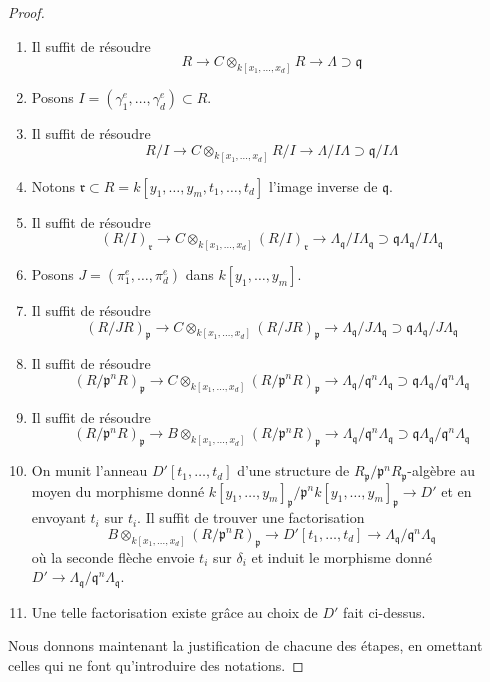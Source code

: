 \begin{proof}
\begin{enumerate}
$$R = k[y_1, \ldots, y_m, t_1, \ldots, t_d]
$$
en envoyant $x_i$ sur $\gamma_i = \pi_i t_i$.
\item
\label{item-first-solve}
Il suffit de résoudre
$$
R
\to
C \otimes_{k[x_1, \ldots, x_d]} R
\to
\Lambda \supset \mathfrak q
$$
\item
\label{item-set-I}
Posons $I = (\gamma_1^e, \ldots, \gamma_d^e) \subset R$.
\item
\label{item-second-resolve}
Il suffit de résoudre
$$
R/I
\to
C \otimes_{k[x_1, \ldots, x_d]} R/I
\to
\Lambda/I\Lambda \supset \mathfrak q/I\Lambda
$$
\item
\label{item-set-r}
Notons $\mathfrak r \subset R = k[y_1, \ldots, y_m, t_1, \ldots, t_d]$
l'image inverse de $\mathfrak q$.
\item
\label{item-third-resolve}
Il suffit de résoudre
$$
(R/I)_\mathfrak r \to
C \otimes_{k[x_1, \ldots, x_d]} (R/I)_\mathfrak r \to
\Lambda_\mathfrak q/I\Lambda_\mathfrak q
\supset
\mathfrak q\Lambda_\mathfrak q/I\Lambda_\mathfrak q
$$
\item
\label{item-fourth-resolve}
Posons $J = (\pi_1^e, \ldots, \pi_d^e)$ dans $k[y_1, \ldots, y_m]$.
\item
\label{item-fifth-resolve}
Il suffit de résoudre
$$
(R/JR)_\mathfrak p \to
C \otimes_{k[x_1, \ldots, x_d]} (R/JR)_\mathfrak p \to
\Lambda_\mathfrak q/J\Lambda_\mathfrak q
\supset
\mathfrak q\Lambda_\mathfrak q/J\Lambda_\mathfrak q
$$
\item
\label{item-sixth-resolve}
Il suffit de résoudre
$$
(R/\mathfrak p^nR)_\mathfrak p \to
C \otimes_{k[x_1, \ldots, x_d]} (R/\mathfrak p^nR)_\mathfrak p \to
\Lambda_\mathfrak q/\mathfrak q^n\Lambda_\mathfrak q
\supset
\mathfrak q\Lambda_\mathfrak q/\mathfrak q^n\Lambda_\mathfrak q
$$
\item
\label{item-seventh-resolve}
Il suffit de résoudre
$$
(R/\mathfrak p^nR)_\mathfrak p \to
B \otimes_{k[x_1, \ldots, x_d]} (R/\mathfrak p^nR)_\mathfrak p \to
\Lambda_\mathfrak q/\mathfrak q^n\Lambda_\mathfrak q
\supset
\mathfrak q\Lambda_\mathfrak q/\mathfrak q^n\Lambda_\mathfrak q
$$
\item
\label{item-eighth-resolve}
On munit l'anneau $D'[t_1, \ldots, t_d]$ d'une structure de
$R_\mathfrak p/\mathfrak p^nR_\mathfrak p$-algèbre au moyen du morphisme donné
$k[y_1, \ldots, y_m]_\mathfrak p/\mathfrak p^n k[y_1, \ldots, y_m]_\mathfrak p
\to D'$ et en envoyant $t_i$ sur $t_i$. Il suffit de trouver une factorisation
$$
B \otimes_{k[x_1, \ldots, x_d]} (R/\mathfrak p^nR)_\mathfrak p
\to D'[t_1, \ldots, t_d] \to
\Lambda_\mathfrak q/\mathfrak q^n\Lambda_\mathfrak q
$$
où la seconde flèche envoie $t_i$ sur $\delta_i$ et induit le
morphisme donné $D' \to \Lambda_\mathfrak q/\mathfrak q^n\Lambda_\mathfrak q$.
\item
\label{item-done}
Une telle factorisation existe grâce au choix de $D'$ fait ci-dessus.
\end{enumerate}
Nous donnons maintenant la justification de chacune des étapes, en omettant
celles qui ne font qu'introduire des notations.


\end{proof}
